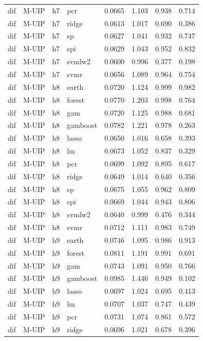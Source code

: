 \begin{ThreePartTable}
\begin{longtable}[t]{llclcccc}
dif & M-UIP & h7 & pcr & 0.0665 & 1.103 & 0.938 & 0.714\\
dif & M-UIP & h7 & ridge & 0.0613 & 1.017 & 0.690 & 0.386\\
dif & M-UIP & h7 & sp & 0.0627 & 1.041 & 0.932 & 0.747\\
dif & M-UIP & h7 & spi & 0.0629 & 1.043 & 0.952 & 0.832\\
dif & M-UIP & h7 & svmlw2 & 0.0600 & 0.996 & 0.377 & 0.198\\
dif & M-UIP & h7 & svmr & 0.0656 & 1.089 & 0.964 & 0.754\\
\addlinespace
dif & M-UIP & h8 & earth & 0.0720 & 1.124 & 0.999 & 0.982\\
dif & M-UIP & h8 & forest & 0.0770 & 1.203 & 0.998 & 0.764\\
dif & M-UIP & h8 & gam & 0.0720 & 1.125 & 0.988 & 0.681\\
dif & M-UIP & h8 & gamboost & 0.0782 & 1.221 & 0.978 & 0.263\\
dif & M-UIP & h8 & lasso & 0.0650 & 1.016 & 0.658 & 0.393\\
dif & M-UIP & h8 & lm & 0.0673 & 1.052 & 0.837 & 0.329\\
dif & M-UIP & h8 & pcr & 0.0699 & 1.092 & 0.895 & 0.617\\
dif & M-UIP & h8 & ridge & 0.0649 & 1.014 & 0.640 & 0.356\\
dif & M-UIP & h8 & sp & 0.0675 & 1.055 & 0.962 & 0.809\\
dif & M-UIP & h8 & spi & 0.0669 & 1.044 & 0.943 & 0.806\\
dif & M-UIP & h8 & svmlw2 & 0.0640 & 0.999 & 0.476 & 0.344\\
dif & M-UIP & h8 & svmr & 0.0712 & 1.111 & 0.983 & 0.749\\
\addlinespace
dif & M-UIP & h9 & earth & 0.0746 & 1.095 & 0.986 & 0.913\\
dif & M-UIP & h9 & forest & 0.0811 & 1.191 & 0.991 & 0.691\\
dif & M-UIP & h9 & gam & 0.0743 & 1.091 & 0.950 & 0.766\\
dif & M-UIP & h9 & gamboost & 0.0985 & 1.446 & 0.949 & 0.102\\
dif & M-UIP & h9 & lasso & 0.0697 & 1.024 & 0.695 & 0.413\\
dif & M-UIP & h9 & lm & 0.0707 & 1.037 & 0.747 & 0.439\\
dif & M-UIP & h9 & pcr & 0.0731 & 1.074 & 0.861 & 0.572\\
dif & M-UIP & h9 & ridge & 0.0696 & 1.021 & 0.678 & 0.396\\

\end{longtable}
\end{ThreePartTable}
